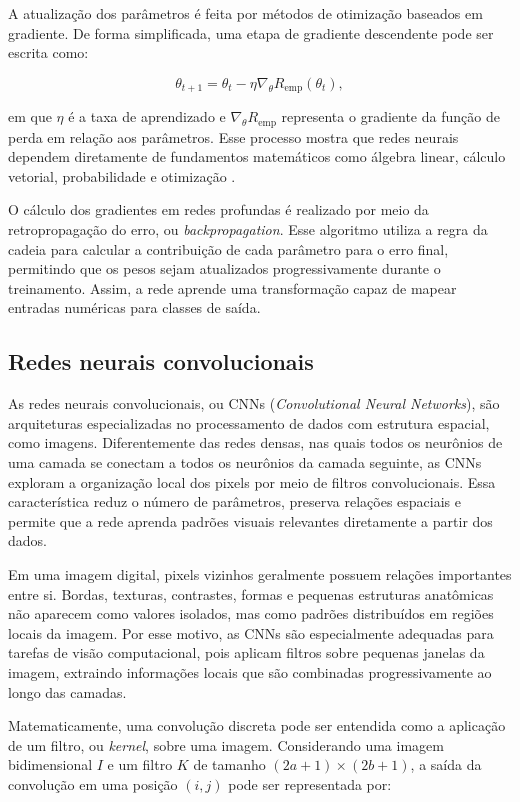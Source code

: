 \documentclass[
    12pt,
    openright,
    oneside,
    a4paper,
    english,
    brazil
]{abntex2}
\begin{document}
A atualização dos parâmetros é feita por métodos de otimização baseados em gradiente. De forma simplificada, uma etapa de gradiente descendente pode ser escrita como:

\[
\theta_{t+1}
=
\theta_t
-
\eta \nabla_{\theta}R_{\text{emp}}(\theta_t),
\]

em que \(\eta\) é a taxa de aprendizado e \(\nabla_{\theta}R_{\text{emp}}\) representa o gradiente da função de perda em relação aos parâmetros. Esse processo mostra que redes neurais dependem diretamente de fundamentos matemáticos como álgebra linear, cálculo vetorial, probabilidade e otimização \cite{deisenroth2020mathematics}.

O cálculo dos gradientes em redes profundas é realizado por meio da retropropagação do erro, ou \textit{backpropagation}. Esse algoritmo utiliza a regra da cadeia para calcular a contribuição de cada parâmetro para o erro final, permitindo que os pesos sejam atualizados progressivamente durante o treinamento. Assim, a rede aprende uma transformação capaz de mapear entradas numéricas para classes de saída.

\subsection{Redes neurais convolucionais}
\label{subsec:redes_neurais_convolucionais}

As redes neurais convolucionais, ou CNNs (\textit{Convolutional Neural Networks}), são arquiteturas especializadas no processamento de dados com estrutura espacial, como imagens. Diferentemente das redes densas, nas quais todos os neurônios de uma camada se conectam a todos os neurônios da camada seguinte, as CNNs exploram a organização local dos pixels por meio de filtros convolucionais. Essa característica reduz o número de parâmetros, preserva relações espaciais e permite que a rede aprenda padrões visuais relevantes diretamente a partir dos dados.

Em uma imagem digital, pixels vizinhos geralmente possuem relações importantes entre si. Bordas, texturas, contrastes, formas e pequenas estruturas anatômicas não aparecem como valores isolados, mas como padrões distribuídos em regiões locais da imagem. Por esse motivo, as CNNs são especialmente adequadas para tarefas de visão computacional, pois aplicam filtros sobre pequenas janelas da imagem, extraindo informações locais que são combinadas progressivamente ao longo das camadas.

Matematicamente, uma convolução discreta pode ser entendida como a aplicação de um filtro, ou \textit{kernel}, sobre uma imagem. Considerando uma imagem bidimensional \(I\) e um filtro \(K\) de tamanho \((2a+1) \times (2b+1)\), a saída da convolução em uma posição \((i,j)\) pode ser representada por:
\end{document}
